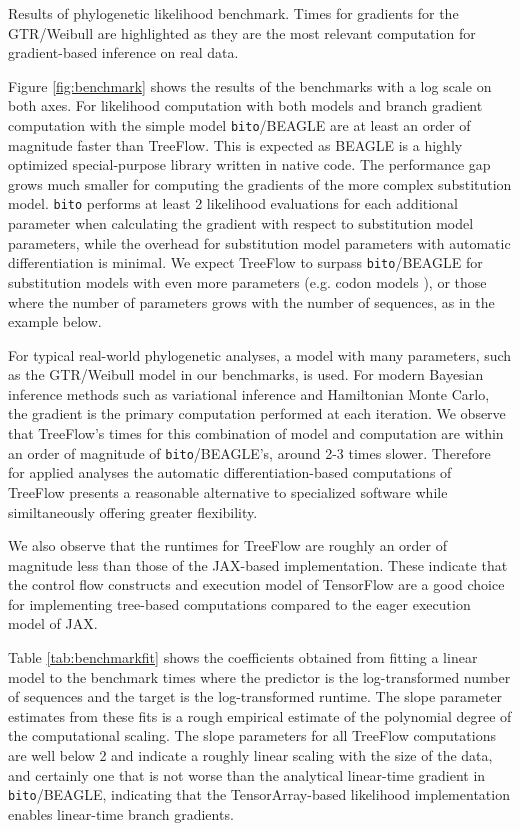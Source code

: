 \begin{table}
    \centering
    \caption{Results of phylogenetic likelihood benchmark. Times for gradients for the GTR/Weibull are highlighted as they are the most relevant computation for gradient-based inference on real data.}
    \label{tab:benchmarkfit}
\end{table}

Figure \ref{fig:benchmark} shows the results of the benchmarks with a log scale on both axes. For likelihood computation with both models and branch gradient computation with the simple model \texttt{bito}/BEAGLE are at least an order of magnitude faster than TreeFlow. This is expected as BEAGLE is a highly optimized special-purpose library written in native code. The performance gap grows much smaller for computing the gradients of the more complex substitution model. \texttt{bito} performs at least 2 likelihood evaluations for each additional parameter when calculating the gradient with respect to substitution model parameters, while the overhead for substitution model parameters with automatic differentiation is minimal. We expect TreeFlow to surpass \texttt{bito}/BEAGLE for substitution models with even more parameters (e.g. codon models \cite{goldman1994codon}), or those where the number of parameters grows with the number of sequences, as in the example below.

For typical real-world phylogenetic analyses, a model with many parameters, such as the GTR/Weibull model in our benchmarks, is used. For modern Bayesian inference methods such as variational inference and Hamiltonian Monte Carlo, the gradient is the primary computation performed at each iteration. We observe that TreeFlow's times for this combination of model and computation are within an order of magnitude of \texttt{bito}/BEAGLE's, around 2-3 times slower. Therefore for applied analyses the automatic differentiation-based computations of TreeFlow presents a reasonable alternative to specialized software while similtaneously offering greater flexibility.

We also observe that the runtimes for TreeFlow are roughly an order of magnitude less than those of the JAX-based implementation. These indicate that the control flow constructs and execution model of TensorFlow are a good choice for implementing tree-based computations compared to the eager execution model of JAX.

Table \ref{tab:benchmarkfit} shows the coefficients obtained from fitting a linear model to the benchmark times where the predictor is the log-transformed number of sequences and the target is the log-transformed runtime. The slope parameter estimates from these fits is a rough empirical estimate of the polynomial degree of the computational scaling. The slope parameters for all TreeFlow computations are well below 2 and indicate a roughly linear scaling with the size of the data, and certainly one that is not worse than the analytical linear-time gradient in \texttt{bito}/BEAGLE, indicating that the TensorArray-based likelihood implementation enables linear-time branch gradients.

